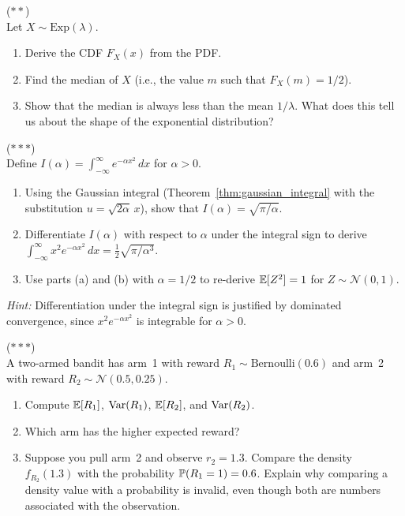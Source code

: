 \documentclass[11pt,a4paper]{article}
\begin{document}
\begin{exercise}
\textnormal{(\(\ast\ast\))} \\
Let $X \sim \mathrm{Exp}(\lambda)$.
\begin{enumerate}[nosep,label=(\alph*)]
    \item Derive the CDF $F_X(x)$ from the PDF.
    \item Find the median of $X$ (i.e., the value $m$ such that
    $F_X(m) = 1/2$).
    \item Show that the median is always less than the mean $1/\lambda$.
    What does this tell us about the shape of the exponential
    distribution?
\end{enumerate}
\end{exercise}

\begin{exercise}
\textnormal{(\(\ast\ast\ast\))} \\
Define $I(\alpha) = \int_{-\infty}^{\infty} e^{-\alpha x^2} \, dx$
for $\alpha > 0$.
\begin{enumerate}[nosep,label=(\alph*)]
    \item Using the Gaussian integral (Theorem~\ref{thm:gaussian_integral}
    with the substitution $u = \sqrt{2\alpha}\,x$), show that
    $I(\alpha) = \sqrt{\pi / \alpha}$.
    \item Differentiate $I(\alpha)$ with respect to $\alpha$ under the
    integral sign to derive $\int_{-\infty}^{\infty} x^2
    e^{-\alpha x^2}\,dx = \frac{1}{2}\sqrt{\pi/\alpha^3}$.
    \item Use parts (a) and (b) with $\alpha = 1/2$ to re-derive
    $\mathbb{E}[Z^2] = 1$ for $Z \sim \mathcal{N}(0,1)$.
\end{enumerate}
\textit{Hint:} Differentiation under the integral sign is justified by
dominated convergence, since $x^2 e^{-\alpha x^2}$ is integrable for
$\alpha > 0$.
\end{exercise}

\begin{exercise}
\textnormal{(\(\ast\ast\ast\))} \\
A two-armed bandit has arm~1 with reward
$R_1 \sim \mathrm{Bernoulli}(0.6)$ and arm~2 with reward
$R_2 \sim \mathcal{N}(0.5, 0.25)$.
\begin{enumerate}[nosep,label=(\alph*)]
    \item Compute $\mathbb{E}[R_1]$, $\operatorname{Var}(R_1)$, $\mathbb{E}[R_2]$, and $\operatorname{Var}(R_2)$.
    \item Which arm has the higher expected reward?
    \item Suppose you pull arm~2 and observe $r_2 = 1.3$. Compare the
    density $f_{R_2}(1.3)$ with the probability $\mathbb{P}(R_1 = 1) = 0.6$.
    Explain why comparing a density value with a probability is
    invalid, even though both are numbers associated with the observation.
\end{enumerate}
\end{exercise}
\end{document}
